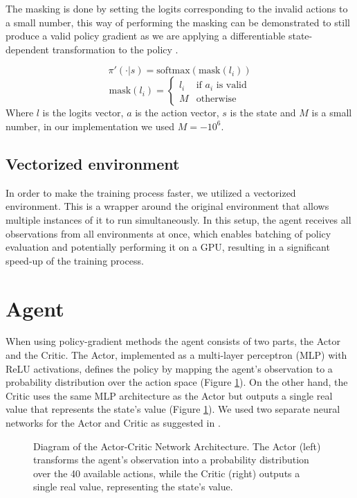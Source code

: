 The masking is done by setting the logits corresponding to the invalid actions to a small number, this way of performing the masking can be demonstrated to still produce a valid policy gradient as we are applying a differentiable state-dependent transformation to the policy \cite{action-masking}.

\begin{equation*}
    \pi'(\cdot|s) = \mathrm{softmax}(\mathrm{mask}(l_i))
\end{equation*}
\begin{equation*}
    \mathrm{mask}(l_{i}) = \begin{cases}
        l_i & \text{if $a_i$ is valid} \\
        M   & \text{otherwise}
    \end{cases}
\end{equation*}
Where $l$ is the logits vector, $a$ is the action vector, $s$ is the state and $M$ is a small number, in our implementation we used $M=-10^6$.

\subsection{Vectorized environment}
In order to make the training process faster, we utilized a vectorized environment. This is a wrapper around the original environment that allows multiple instances of it to run simultaneously. In this setup, the agent receives all observations from all environments at once, which enables batching of policy evaluation and potentially performing it on a GPU, resulting in a significant speed-up of the training process.

\section{Agent}
When using policy-gradient methods the agent consists of two parts, the Actor and the Critic. The Actor, implemented as a multi-layer perceptron (MLP) with ReLU activations, defines the policy by mapping the agent's observation to a probability distribution over the action space (Figure \ref{fig:actor-critic-network}). On the other hand, the Critic uses the same MLP architecture as the Actor but outputs a single real value that represents the state's value (Figure \ref{fig:actor-critic-network}). We used two separate neural networks for the Actor and Critic as suggested in \cite{ppo-implementation-details}.

\begin{figure}[H]
    \centering
    
    \caption{Diagram of the Actor-Critic Network Architecture. The Actor (left) transforms the agent's observation into a probability distribution over the 40 available actions, while the Critic (right) outputs a single real value, representing the state's value.}
    \label{fig:actor-critic-network}
\end{figure}


